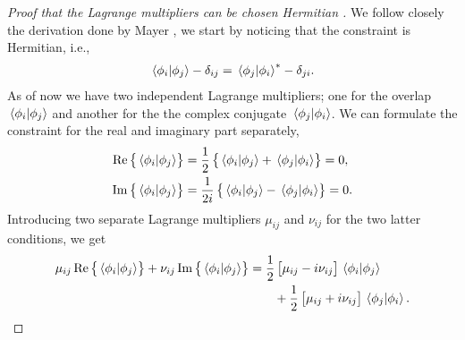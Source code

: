             \begin{proof}[%
                    Proof that the Lagrange multipliers can be chosen Hermitian%
                ]
                We follow closely the derivation done by Mayer
                \cite{mayer2003simple}, we start by noticing that the constraint is
                Hermitian, i.e.,
                \begin{align}
                    \braket*{\phi_i}{\phi_j} - \delta_{ij}
                    = \braket*{\phi_j}{\phi_i}^{*} - \delta_{ji}.
                \end{align}
                As of now we have two independent Lagrange multipliers; one for
                the overlap $\braket*{\phi_i}{\phi_j}$ and another for the the
                complex conjugate $\braket*{\phi_j}{\phi_i}$.
                We can formulate the constraint for the real and imaginary part
                separately,
                \begin{align}
                    \Re\left\{ 
                        \braket*{\phi_i}{\phi_j}
                     \right\}
                    &=
                    \frac{1}{2}\left\{ 
                        \braket*{\phi_i}{\phi_j}
                        + \braket*{\phi_j}{\phi_i}
                     \right\}
                    = 0,
                    \\
                    \Im\left\{ 
                        \braket*{\phi_i}{\phi_j}
                     \right\}
                    &=
                    \frac{1}{2i}\left\{ 
                        \braket*{\phi_i}{\phi_j}
                        - \braket*{\phi_j}{\phi_i}
                     \right\}
                    = 0.
                \end{align}
                Introducing two separate Lagrange multipliers $\mu_{ij}$ and
                $\nu_{ij}$ for the two latter conditions, we get
                \begin{align}
                    \mu_{ij}\Re\brac{
                        \braket*{\phi_i}{\phi_j}
                    }
                    + \nu_{ij}\Im\brac{
                        \braket*{\phi_i}{\phi_j}
                    }
                    &=
                    \half\brak{
                        \mu_{ij} - i\nu_{ij}
                    }
                    \braket*{\phi_i}{\phi_j}
                    \nonumber
                    \\
                    &\qquad
                    + \half\brak{
                        \mu_{ij} + i\nu_{ij}
                    }
                    \braket*{\phi_j}{\phi_i}.

\end{align}
\end{proof}
